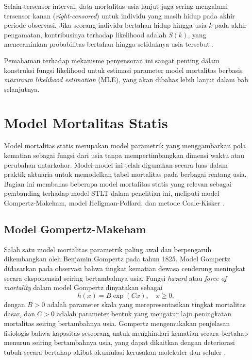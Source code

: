 Selain tersensor interval, data mortalitas usia lanjut juga sering mengalami tersensor kanan (\textit{right-censored}) untuk individu yang masih hidup pada akhir periode observasi. Jika seorang individu bertahan hidup hingga usia $k$ pada akhir pengamatan, kontribusinya terhadap likelihood adalah $S(k)$, yang mencerminkan probabilitas bertahan hingga setidaknya usia tersebut \citep{huang2020modelling}.

Pemahaman terhadap mekanisme penyensoran ini sangat penting dalam konstruksi fungsi likelihood untuk estimasi parameter model mortalitas berbasis \textit{maximum likelihood estimation} (MLE), yang akan dibahas lebih lanjut dalam bab selanjutnya.

\section{Model Mortalitas Statis}

Model mortalitas statis merupakan model parametrik yang menggambarkan pola kematian sebagai fungsi dari usia tanpa mempertimbangkan dimensi waktu atau perubahan antarkohor. Model-model ini telah digunakan secara luas dalam praktik aktuaria untuk memodelkan tabel mortalitas pada berbagai rentang usia. Bagian ini membahas beberapa model mortalitas statis yang relevan sebagai pembanding terhadap model STLT dalam penelitian ini, meliputi model Gompertz-Makeham, model Heligman-Pollard, dan metode Coale-Kisker \citep{huang2020modelling, dickson2020actuarial}.

\subsection{Model Gompertz-Makeham}

Salah satu model mortalitas parametrik paling awal dan berpengaruh dikembangkan oleh Benjamin Gompertz pada tahun 1825. Model Gompertz didasarkan pada observasi bahwa tingkat kematian dewasa cenderung meningkat secara eksponensial seiring bertambahnya usia. Fungsi \textit{hazard} atau \textit{force of mortality} dalam model Gompertz dinyatakan sebagai
\begin{equation}
    h(x) = B \exp(Cx), \quad x \geq 0,
\end{equation}
dengan $B > 0$ adalah parameter skala yang merepresentasikan tingkat mortalitas dasar, dan $C > 0$ adalah parameter bentuk yang mengatur laju peningkatan mortalitas seiring bertambahnya usia. Gompertz mengemukakan penjelasan fisiologis bahwa kapasitas seseorang untuk menghindari kematian secara bertahap menurun seiring bertambahnya usia, yang dapat dikaitkan dengan deteriorasi tubuh secara bertahap akibat akumulasi kerusakan molekuler dan seluler \citep{gompertz1825nature, thatcher1998force}.

